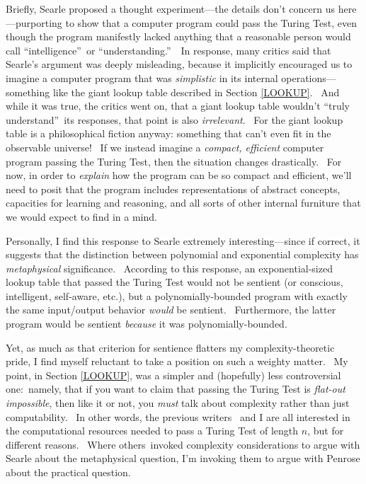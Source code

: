 \documentclass[11pt,onecolumn]{article}%
\begin{document}
Briefly, Searle proposed a thought experiment---the details don't concern us
here---purporting to show that a computer program could pass the Turing Test,
even though the program manifestly lacked anything that a reasonable person
would call \textquotedblleft intelligence\textquotedblright\ or
\textquotedblleft understanding.\textquotedblright\ \ In response, many
critics said that Searle's argument was deeply misleading, because it
implicitly encouraged us to imagine a computer program that was
\textit{simplistic} in its internal operations---something like the giant
lookup table described in Section \ref{LOOKUP}. \ And while it was true, the
critics went on, that a giant lookup table wouldn't \textquotedblleft truly
understand\textquotedblright\ its responses, that point is also
\textit{irrelevant}. \ For the giant lookup table is a philosophical fiction
anyway: something that can't even fit in the observable universe! \ If we
instead imagine a \textit{compact, efficient} computer program passing the
Turing Test, then the situation changes drastically. \ For now, in order to
\textit{explain} how the program can be so compact and efficient, we'll need
to posit that the program includes representations of abstract concepts,
capacities for learning and reasoning, and all sorts of other internal
furniture that we would expect to find in a mind.

Personally, I find this response to Searle extremely interesting---since if
correct, it suggests that the distinction between polynomial and exponential
complexity has \textit{metaphysical} significance. \ According to this
response, an exponential-sized lookup table that passed the Turing Test would
not be sentient (or conscious, intelligent, self-aware, etc.), but a
polynomially-bounded program with exactly the same input/output behavior
\textit{would} be sentient. \ Furthermore, the latter program would be
sentient \textit{because} it was polynomially-bounded.

Yet, as much as that criterion for sentience flatters my complexity-theoretic
pride, I find myself reluctant to take a position on such a weighty matter.
\ My point, in Section \ref{LOOKUP}, was a simpler and (hopefully) less
controversial one:\ namely, that if you want to claim that passing the Turing
Test is \textit{flat-out impossible}, then like it or not, you \textit{must}
talk about complexity rather than just computability. \ In other words, the
previous writers \cite{block,parberry,levesque,shieber}\ and I are all
interested in the computational resources needed to pass a Turing Test of
length $n$, but for different reasons. \ Where others\ invoked complexity
considerations to argue with Searle about the metaphysical question, I'm
invoking them to argue with Penrose about the practical question.
\end{document}
